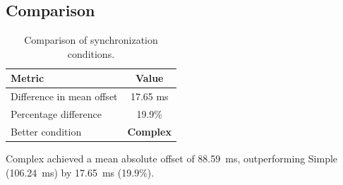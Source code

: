 \subsection*{Comparison}

\begin{table}[h!]
\centering
\begin{tabular}{|l|c|}
\hline
Metric & Value \\
\hline
Difference in mean offset & 17.65 ms \\
Percentage difference & 19.9\% \\
Better condition & \textbf{Complex} \\
\hline
\end{tabular}
\caption{Comparison of synchronization conditions.}
\label{tab:sync_comparison}
\end{table}

Complex achieved a mean absolute offset of 88.59~ms, outperforming Simple (106.24~ms) by 17.65~ms (19.9\%).
